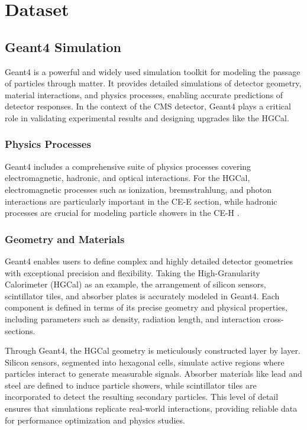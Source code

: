 \chapter{Dataset}
\section{Geant4 Simulation}

Geant4 is a powerful and widely used simulation toolkit for modeling the passage of particles through matter. It provides detailed simulations of detector geometry, material interactions, and physics processes, enabling accurate predictions of detector responses. In the context of the CMS detector, Geant4 plays a critical role in validating experimental results and designing upgrades like the HGCal.

\subsection{Physics Processes}

Geant4 includes a comprehensive suite of physics processes covering electromagnetic, hadronic, and optical interactions. For the HGCal, electromagnetic processes such as ionization, bremsstrahlung, and photon interactions are particularly important in the CE-E section, while hadronic processes are crucial for modeling particle showers in the CE-H \cite{geant4_toolkit}.

\subsection{Geometry and Materials}

Geant4 enables users to define complex and highly detailed detector geometries with exceptional precision and flexibility. Taking the High-Granularity Calorimeter (HGCal) as an example, the arrangement of silicon sensors, scintillator tiles, and absorber plates is accurately modeled in Geant4. Each component is defined in terms of its precise geometry and physical properties, including parameters such as density, radiation length, and interaction cross-sections.

Through Geant4, the HGCal geometry is meticulously constructed layer by layer. Silicon sensors, segmented into hexagonal cells, simulate active regions where particles interact to generate measurable signals. Absorber materials like lead and steel are defined to induce particle showers, while scintillator tiles are incorporated to detect the resulting secondary particles. This level of detail ensures that simulations replicate real-world interactions, providing reliable data for performance optimization and physics studies.

